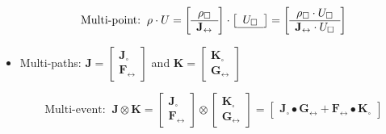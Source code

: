 \begin{itemize}
\[\text{Multi-point:} \;\; \rho \cdot U = \left[\begin{array}{c} \rho_\square \\ \hline \mathbf{J}_\leftrightarrow \end{array}\right] \cdot \left[\begin{array}{c} U_\square \\ \hline \end{array}\right] = \left[\begin{array}{c} \rho_\square \cdot U_\square \\ \hline \mathbf{J}_\leftrightarrow \cdot U_\square \end{array}\right]\] 
\item 
Multi-paths: \(\mathbf{J} = \left[\begin{array}{c} \mathbf{J}_\square \\ \hline \mathbf{F}_\leftrightarrow \end{array}\right]\) and \(\mathbf{K} = \left[\begin{array}{c} \mathbf{K}_\square \\ \hline \mathbf{G}_\leftrightarrow \end{array}\right]\) 

\[\text{Multi-event:} \;\; \mathbf{J} \otimes \mathbf{K} = \left[\begin{array}{c} \mathbf{J}_\square \\ \hline \mathbf{F}_\leftrightarrow \end{array}\right] \otimes \left[\begin{array}{c} \mathbf{K}_\square \\ \hline \mathbf{G}_\leftrightarrow \end{array}\right] = \left[\begin{array}{c} \hline \mathbf{J}_\square \bullet \mathbf{G}_\leftrightarrow + \mathbf{F}_\leftrightarrow \bullet \mathbf{K}_\square \end{array}\right]\]
\end{itemize}











